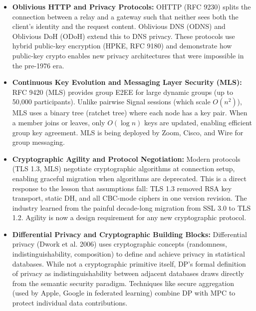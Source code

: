 \begin{itemize}
\item \textbf{Oblivious HTTP and Privacy Protocols:} OHTTP (RFC 9230) splits the connection between a relay and a gateway such that neither sees both the client's identity and the request content. Oblivious DNS (ODNS) and Oblivious DoH (ODoH) extend this to DNS privacy. These protocols use hybrid public-key encryption (HPKE, RFC 9180) and demonstrate how public-key crypto enables new privacy architectures that were impossible in the pre-1976 era.

\item \textbf{Continuous Key Evolution and Messaging Layer Security (MLS):} RFC 9420 (MLS) provides group E2EE for large dynamic groups (up to 50,000 participants). Unlike pairwise Signal sessions (which scale $O(n^2)$), MLS uses a binary tree (ratchet tree) where each node has a key pair. When a member joins or leaves, only $O(\log n)$ keys are updated, enabling efficient group key agreement. MLS is being deployed by Zoom, Cisco, and Wire for group messaging.

\item \textbf{Cryptographic Agility and Protocol Negotiation:} Modern protocols (TLS 1.3, MLS) negotiate cryptographic algorithms at connection setup, enabling graceful migration when algorithms are deprecated. This is a direct response to the lesson that assumptions fall: TLS 1.3 removed RSA key transport, static DH, and all CBC-mode ciphers in one version revision. The industry learned from the painful decade-long migration from SSL 3.0 to TLS 1.2. Agility is now a design requirement for any new cryptographic protocol.

\item \textbf{Differential Privacy and Cryptographic Building Blocks:} Differential privacy (Dwork et al. 2006) uses cryptographic concepts (randomness, indistinguishability, composition) to define and achieve privacy in statistical databases. While not a cryptographic primitive itself, DP's formal definition of privacy as indistinguishability between adjacent databases draws directly from the semantic security paradigm. Techniques like secure aggregation (used by Apple, Google in federated learning) combine DP with MPC to protect individual data contributions.
\end{itemize}

